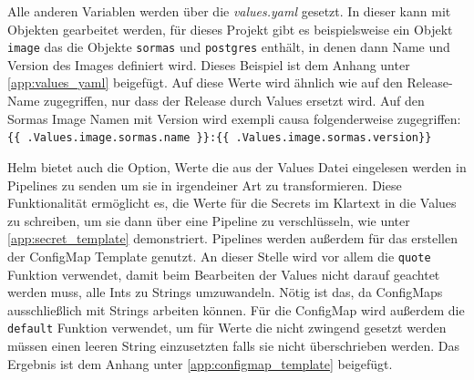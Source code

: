 Alle anderen Variablen werden über die \textit{values.yaml} gesetzt.
In dieser kann mit Objekten gearbeitet werden, für dieses Projekt gibt es beispielsweise ein Objekt \texttt{image} das die Objekte \texttt{sormas} und \texttt{postgres} enthält, in denen dann Name und Version des Images definiert wird. 
Dieses Beispiel ist dem Anhang unter \ref{app:values_yaml} beigefügt.
Auf diese Werte wird ähnlich wie auf den Release-Name zugegriffen, nur dass der Release durch Values ersetzt wird.
Auf den Sormas Image Namen mit Version wird exempli causa folgenderweise zugegriffen: \texttt{ \{\{ .Values.image.sormas.name \}\}:\{\{ .Values.image.sormas.version\}\} }

Helm bietet auch die Option, Werte die aus der Values Datei eingelesen werden in Pipelines zu senden um sie in irgendeiner Art zu transformieren. 
Diese Funktionalität ermöglicht es, die Werte für die Secrets im Klartext in die Values zu schreiben, um sie dann über eine Pipeline zu verschlüsseln, wie unter \ref{app:secret_template} demonstriert.
Pipelines werden außerdem für das erstellen der ConfigMap Template genutzt. 
An dieser Stelle wird vor allem die \texttt{quote} Funktion verwendet, damit beim Bearbeiten der Values nicht darauf geachtet werden muss, alle Ints zu Strings umzuwandeln. 
Nötig ist das, da ConfigMaps ausschließlich mit Strings arbeiten können.
Für die ConfigMap wird außerdem die \texttt{default} Funktion verwendet, um für Werte die nicht zwingend gesetzt werden müssen einen leeren String einzusetzten falls sie nicht überschrieben werden.
Das Ergebnis ist dem Anhang unter \ref{app:configmap_template} beigefügt.